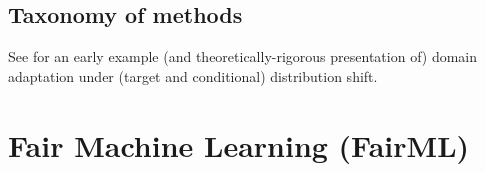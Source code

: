 \subsection{Taxonomy of methods}
%
See \cite{zhang2013domain} for an early example (and theoretically-rigorous presentation of) domain
adaptation under (target and conditional) distribution shift.
%
\section{Fair Machine Learning (FairML)}\label{sec:fairml}

